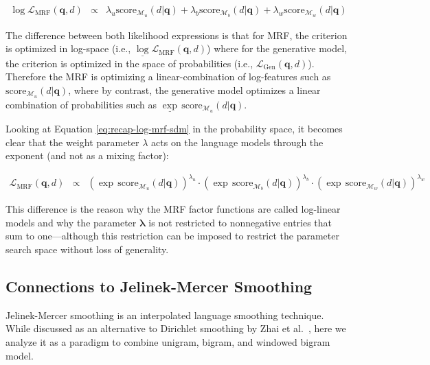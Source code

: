 \documentclass[]{article}
\begin{document}
\begin{eqnarray}
\log\mathcal{L}_{\mbox{MRF}}(\mathbf{q},d) & \propto & \lambda_{u}\mbox{score}_{\mathcal{M}_{u}}(d|\mathbf{q})+\lambda_{b}\mbox{score}_{\mathcal{M}_{b}}(d|\mathbf{q})+\lambda_{w}\mbox{score}_{\mathcal{M}_{w}}(d|\mathbf{q})\label{eq:recap-log-mrf-sdm}
\end{eqnarray}

The difference between both likelihood expressions is that for MRF,
the criterion is optimized in log-space (i.e., $\underline{\log}\mathcal{L}_{\mbox{MRF}}(\mathbf{q},d)$)
where for the generative model, the criterion is optimized in the
space of probabilities (i.e., $\mathcal{L}_{\mbox{Gen}}(\mathbf{q},d)$).
Therefore the MRF is optimizing a linear-combination of log-features
such as $\mbox{score}_{\mathcal{M}_{u}}(d|\mathbf{q})$, where by
contrast, the generative model optimizes a linear combination of probabilities
such as $\underline{\exp}\,\mbox{score}_{\mathcal{M}_{u}}(d|\mathbf{q})$. 

Looking at Equation \ref{eq:recap-log-mrf-sdm} in the probability
space, it becomes clear that the weight parameter $\lambda$ acts
on the language models through the exponent (and not as a mixing factor):

\begin{eqnarray*}
\mathcal{L}_{\mbox{MRF}}(\mathbf{q},d) & \propto & \left(\exp\,\mbox{score}_{\mathcal{M}_{u}}(d|\mathbf{q})\right)^{\lambda_{u}} \cdot\left(\exp\,\mbox{score}_{\mathcal{M}_{b}}(d|\mathbf{q})\right)^{\lambda_{b}}\cdot\left(\exp\,\mbox{score}_{\mathcal{M}_{w}}(d|\mathbf{q})\right)^{\lambda_{w}}
\end{eqnarray*}


This difference is the reason why the MRF factor functions are called log-linear
models and why the parameter $\boldsymbol{\lambda}$ is not restricted
to nonnegative entries that sum to one---although this restriction
can be imposed to restrict the parameter search space without loss
of generality. 

\subsection{Connections to Jelinek-Mercer Smoothing}

Jelinek-Mercer smoothing \cite{chen1996smoothing} is an interpolated
language smoothing technique. While discussed as an alternative to
Dirichlet smoothing by Zhai et al.\ \cite{zhai2001smoothing}, here
we analyze it as a paradigm to combine unigram, bigram, and windowed
bigram model.
\end{document}
